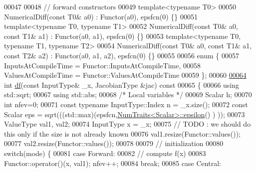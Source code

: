 \begin{DoxyCode}
00047 
00048     \textcolor{comment}{// forward constructors}
00049     \textcolor{keyword}{template}<\textcolor{keyword}{typename} T0>
00050         NumericalDiff(\textcolor{keyword}{const} T0& a0) : Functor(a0), epsfcn(0) \{\}
00051     \textcolor{keyword}{template}<\textcolor{keyword}{typename} T0, \textcolor{keyword}{typename} T1>
00052         NumericalDiff(\textcolor{keyword}{const} T0& a0, \textcolor{keyword}{const} T1& a1) : Functor(a0, a1), epsfcn(0) \{\}
00053     \textcolor{keyword}{template}<\textcolor{keyword}{typename} T0, \textcolor{keyword}{typename} T1, \textcolor{keyword}{typename} T2>
00054         NumericalDiff(\textcolor{keyword}{const} T0& a0, \textcolor{keyword}{const} T1& a1, \textcolor{keyword}{const} T2& a2) : Functor(a0, a1, a2), epsfcn(0) \{\}
00055 
00056     \textcolor{keyword}{enum} \{
00057         InputsAtCompileTime = Functor::InputsAtCompileTime,
00058         ValuesAtCompileTime = Functor::ValuesAtCompileTime
00059     \};
00060 
\hyperlink{class_eigen_1_1_numerical_diff_a8fc63f1c3307cc6e61dc4d70c57b5037}{00064}     \textcolor{keywordtype}{int} \hyperlink{class_eigen_1_1_numerical_diff_a8fc63f1c3307cc6e61dc4d70c57b5037}{df}(\textcolor{keyword}{const} InputType& \_x, JacobianType &jac)\textcolor{keyword}{ const}
00065 \textcolor{keyword}{    }\{
00066         \textcolor{keyword}{using} std::sqrt;
00067         \textcolor{keyword}{using} std::abs;
00068         \textcolor{comment}{/* Local variables */}
00069         Scalar h;
00070         \textcolor{keywordtype}{int} nfev=0;
00071         \textcolor{keyword}{const} \textcolor{keyword}{typename} InputType::Index n = \_x.size();
00072         \textcolor{keyword}{const} Scalar eps = sqrt(((std::max)(epsfcn,\hyperlink{group___core___module_struct_eigen_1_1_num_traits}{NumTraits<Scalar>::epsilon}() )
      ));
00073         ValueType val1, val2;
00074         InputType x = \_x;
00075         \textcolor{comment}{// TODO : we should do this only if the size is not already known}
00076         val1.resize(Functor::values());
00077         val2.resize(Functor::values());
00078 
00079         \textcolor{comment}{// initialization}
00080         \textcolor{keywordflow}{switch}(mode) \{
00081             \textcolor{keywordflow}{case} Forward:
00082                 \textcolor{comment}{// compute f(x)}
00083                 Functor::operator()(x, val1); nfev++;
00084                 \textcolor{keywordflow}{break};
00085             \textcolor{keywordflow}{case} Central:

\end{DoxyCode}
